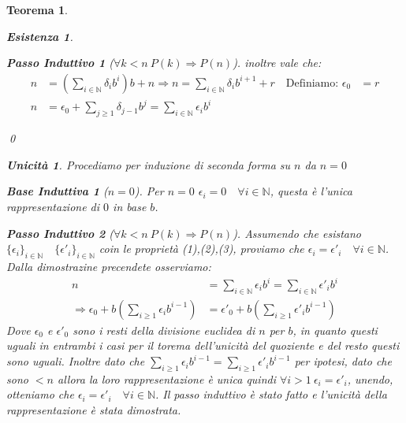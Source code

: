 \documentclass{article}
\makeatletter
\renewenvironment{proof}[1][\proofname]{\par
    \pushQED{\qed}%
    \normalfont \topsep6\p@\@plus6\p@\relax
    \trivlist
    \item\relax
    {\itshape
    #1\@addpunct{.}}\hspace\labelsep\ignorespaces
    }{%
    \popQED\endtrivlist\@endpefalse
}
\newtheorem{theorem}{Teorema}[part]
\theoremstyle{definition}
\newtheorem*{existence}{Esistenza}
\newtheorem*{uniqueness}{Unicità}
\newtheorem*{base}{Base Induttiva}
\newtheorem*{step}{Passo Induttivo}
\makeatother
\begin{document}
\begin{theorem}
\begin{proof}
\begin{existence}
\begin{step}[$\forall k<n\ P(k)\Rightarrow P(n)$]
                inoltre vale che:
                \[
                    \begin{aligned}
                        n&=(\sum_{i\in\mathbb{N}}\delta_ib^i)b+n\Rightarrow n=\sum_{i\in\mathbb{N}}\delta_ib^{i+1}+r\quad \text{Definiamo: }\epsilon_0&=r\\
                        n&=\epsilon_0+\sum_{j\geq 1}\delta_{j-1}b^j=\sum_{i\in\mathbb{N}}\epsilon_ib^i
                    \end{aligned}
                \]
            \end{step}
        \qed
        \end{existence}
        \begin{uniqueness}
            Procediamo per induzione di seconda forma su \(n\) da \(n=0\)
            \begin{base}[$n=0$]
                Per \(n=0\) \(\epsilon_i=0\quad \forall i\in\mathbb{N}\), questa è l'unica rappresentazione di \(0\) in base \(b\).
            \end{base}
            \begin{step}[$\forall k<n\ P(k)\Rightarrow P(n)$]
                Assumendo che esistano \(\{\epsilon_i\}_{i\in\mathbb{N}}\quad \{\epsilon'_i\}_{i\in\mathbb{N}}\) coin le proprietà (1),(2),(3), proviamo che \(\epsilon_i=\epsilon'_i\quad \forall i\in\mathbb{N}\). 
                Dalla dimostrazine precendete osserviamo:
                \[
                    \begin{aligned}
                        n&=\sum_{i\in\mathbb{N}}\epsilon_ib^i=\sum_{i\in\mathbb{N}}\epsilon'_ib^i\\
                        \Rightarrow \epsilon_0+b(\sum_{i\geq1}\epsilon_ib^{i-1})&=\epsilon'_0+b(\sum_{i\geq1}\epsilon'_ib^{i-1})
                    \end{aligned}
                \]
                Dove \(\epsilon_0\) e \(\epsilon'_0\) sono i resti della divisione euclidea di \(n\) per \(b\), in quanto questi uguali in entrambi i casi per il torema dell'unicità del quoziente e del resto questi sono uguali.
                Inoltre dato che \(\sum_{i\geq1}\epsilon_ib^{i-1}=\sum_{i\geq1}\epsilon'_ib^{i-1}\) per ipotesi, dato che sono \(<n\) allora la loro rappresentazione è unica quindi \(\forall i>1\ \epsilon_i=\epsilon'_i\), unendo, otteniamo che \(\epsilon_i=\epsilon'_i\quad \forall i\in\mathbb{N}\).
                Il passo induttivo è stato fatto e l'unicità della rappresentazione è stata dimostrata.
            \end{step}
        \end{uniqueness}
        \raggedleft{\pushQED{\ensuremath{\blacksquare}}}
    \end{proof}
\end{theorem}
\end{document}
